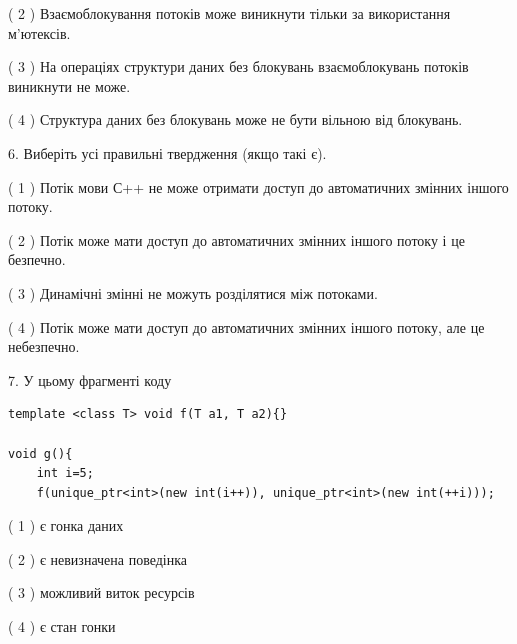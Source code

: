 \documentclass[12pt, ukrainian]{article}
\begin{document}
\begin {large}
{( 2 ) Взаємоблокування потоків може виникнути тільки за використання м’ютексів.%

( 3 ) На операціях структури даних без блокувань взаємоблокувань потоків виникнути не може.%

( 4 ) Структура даних без блокувань може не бути вільною від блокувань.%
\newpage



\vspace{5mm}
6. Виберіть усі правильні твердження (якщо такі є).\par
\vspace{2mm}

( 1 ) Потік мови С++ не може отримати доступ до автоматичних змінних іншого потоку.%

( 2 ) Потік може мати доступ до автоматичних змінних іншого потоку і це безпечно.%

( 3 ) Динамічні змінні не можуть розділятися між потоками.%

( 4 ) Потік може мати доступ до автоматичних змінних іншого потоку, але це небезпечно.%


\vspace{5mm}
7. У цьому фрагменті коду
\begin{verbatim}
template <class T> void f(T a1, T a2){}

void g(){
    int i=5;
    f(unique_ptr<int>(new int(i++)), unique_ptr<int>(new int(++i)));
\end{verbatim}

( 1 ) є гонка даних%

( 2 ) є невизначена поведінка%

( 3 ) можливий виток ресурсів%

( 4 ) є стан гонки%
}
\end {large}
\end{document}
